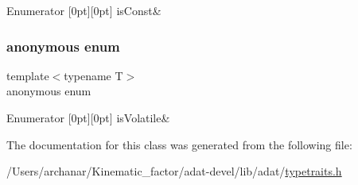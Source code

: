 \begin{DoxyEnumFields}{Enumerator}
[0pt][0pt]{}\mbox{\label{classUtil_1_1TypeTraits_a99cd5bc4b087089f352434d7f482e1cba26a0a78aeec8fa5c5c02c774b73585cd}} 
is\+Const&\\
\hline

\end{DoxyEnumFields}
\mbox{\label{classUtil_1_1TypeTraits_abc08b845a07e81bbc4a304c6f3b24b51}} 
\subsubsection{\texorpdfstring{anonymous enum}{anonymous enum}}
{\footnotesize\ttfamily template$<$typename T$>$ \\
anonymous enum}

\begin{DoxyEnumFields}{Enumerator}
[0pt][0pt]{}\mbox{\label{classUtil_1_1TypeTraits_abc08b845a07e81bbc4a304c6f3b24b51ad832c3ecd956e173f499202b8a249453}} 
is\+Volatile&\\
\hline

\end{DoxyEnumFields}


The documentation for this class was generated from the following file\+:\begin{DoxyCompactItemize}
\item 
/\+Users/archanar/\+Kinematic\+\_\+factor/adat-\/devel/lib/adat/\mbox{\hyperlink{adat-devel_2lib_2adat_2typetraits_8h}{typetraits.\+h}}\end{DoxyCompactItemize}
